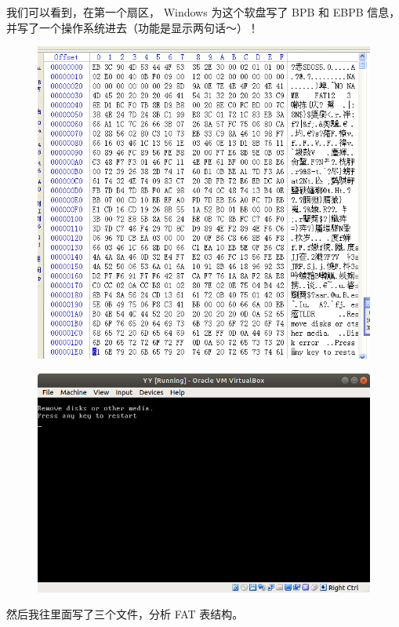 \documentclass[a4paper]{article}
\begin{document}
我们可以看到，在第一个扇区， Windows 为这个软盘写了 BPB 和 EBPB 信息，并写了一个操作系统进去（功能是显示两句话～）！

\begin{figure}[!hbp]
\centering
\includegraphics[scale=0.5]{pics/4.png}
\end{figure}

\newpage

\begin{figure}[!hbp]
\centering
\includegraphics[scale=0.5]{pics/5.png}
\end{figure}

然后我往里面写了三个文件，分析 FAT 表结构。
\end{document}
